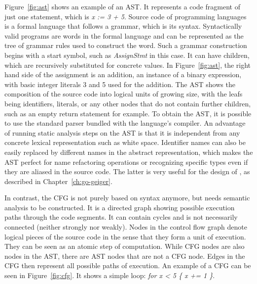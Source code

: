 Figure~\ref{fig:ast} shows an example of an \acrshort{AST}.
It represents a code fragment of just one statement, which is \textit{x := 3 + 5}.
Source code of programming languages is a formal language that follows a grammar, which is its syntax.
Syntactically valid programs are words in the formal language and can be represented as the tree of grammar rules used
to construct the word.
Such a grammar construction begins with a start symbol, such as \textit{AssignStmt} in this case.
It can have children, which are recursively substituted for concrete values.
In Figure~\ref{fig:ast}, the right hand side of the assignment is an addition, an instance of a binary expression, with
basic integer literals 3 and 5 used for the addition.
The \acrshort{AST} shows the composition of the source code into logical units of growing size, with the leafs being
identifiers, literals, or any other nodes that do not contain further children, such as an empty return statement for
example.
To obtain the \acrshort{AST}, it is possible to use the standard parser bundled with the language's compiler.
An advantage of running static analysis steps on the \acrshort{AST} is that it is independent from any concrete lexical
representation such as white space.
Identifier names can also be easily replaced by different names in the abstract representation, which makes the
\acrshort{AST} perfect for name refactoring operations or recognizing specific types even if they are aliased in the
source code.
The latter is very useful for the design of \toolGeiger{}, as described in Chapter~\ref{ch:go-geiger}.



In contrast, the \acrshort{CFG} is not purely based on syntax anymore, but needs semantic analysis to be constructed.
It is a directed graph showing possible execution paths through the code segments.
It can contain cycles and is not necessarily connected (neither strongly nor weakly).
Nodes in the control flow graph denote logical pieces of the source code in the sense that they form a unit of
execution.
They can be seen as an atomic step of computation.
While \acrshort{CFG} nodes are also nodes in the \acrshort{AST}, there are \acrshort{AST} nodes that are not a
\acrshort{CFG} node.
Edges in the \acrshort{CFG} then represent all possible paths of execution.
An example of a \acrshort{CFG} can be seen in Figure~\ref{fig:cfg}.
It shows a simple loop: \textit{for x < 5 \{ x += 1 \}}.



